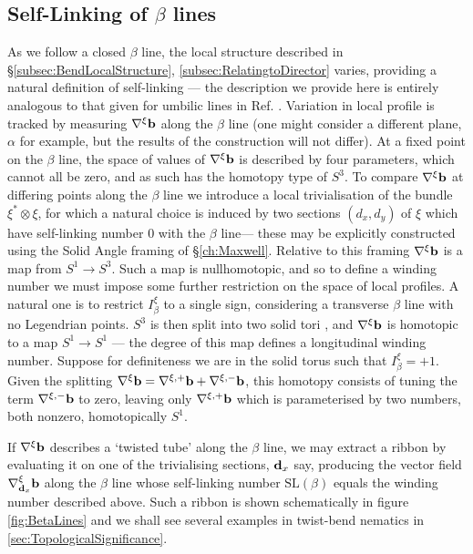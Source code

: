 {\subsection{Self-Linking of $\beta$ lines}
\label{subsec:Self-Linking}
As we follow a closed $\beta$ line, the local structure described in \S\ref{subsec:BendLocalStructure}, \ref{subsec:RelatingtoDirector} varies, providing a natural definition of self-linking --- the description we provide here is entirely analogous to that given for umbilic lines in Ref. \citep{Machon2016b}. Variation in local profile is tracked by measuring $\nabla^\xi \mathbf{b}$ along the $\beta$ line (one might consider a different plane, $\alpha$ for example, but the results of the construction will not differ). At a fixed point on the $\beta$ line, the space of values of $\nabla^\xi \mathbf{b}$ is described by four parameters, which cannot all be zero, and as such has the homotopy type of $S^3$. To compare $\nabla^\xi \mathbf{b}$ at differing points along the $\beta$ line we introduce a local trivialisation of the bundle $\xi^*\otimes\xi$, for which a natural choice is induced by two sections $(d_x,d_y)$ of $\xi$ which have self-linking number $0$ with the $\beta$ line--- these may be explicitly constructed using the Solid Angle framing of \S\ref{ch:Maxwell}. Relative to this framing $\nabla^\xi \mathbf{b}$ is a map from $S^1 \rightarrow S^3$. Such a map is nullhomotopic, and so to define a winding number we must impose some further restriction on the space of local profiles. A natural one is to restrict $I_\beta^\xi$ to a single sign, considering a transverse $\beta$ line with no Legendrian points. $S^3$ is then split into two solid tori \citep{Machon2016b}, and $\nabla^\xi \mathbf{b}$ is homotopic to a map $S^1 \rightarrow S^1$ --- the degree of this map defines a longitudinal winding number. Suppose for definiteness we are in the solid torus such that $I^\xi_\beta= +1$. Given the splitting $\nabla^\xi \mathbf{b} =  \nabla^{\xi,+}\mathbf{b} +\nabla^{\xi,-}\mathbf{b}$, this homotopy consists of tuning the term $\nabla^{\xi,-}\mathbf{b}$ to zero, leaving only $\nabla^{\xi,+}\mathbf{b}$ which is parameterised by two numbers, both nonzero, homotopically $S^1$.

If $\nabla^\xi \mathbf{b}$ describes a `twisted tube' along the $\beta$ line, we may extract a ribbon by evaluating it on one of the trivialising sections, $\mathbf{d}_x$ say, producing the vector field $\nabla^\xi_{\mathbf{d}_x} \mathbf{b}$ along the $\beta$ line whose self-linking number $\mathrm{SL}(\beta)$ equals the winding number described above. Such a ribbon is shown schematically in figure \ref{fig:BetaLines} and we shall see several examples in twist-bend nematics in \ref{sec:TopologicalSignificance}.
 
}
